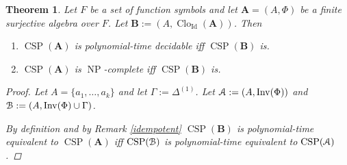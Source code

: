 \documentclass{amsart}
\theoremstyle{plain}
\newtheorem{theorem}{Theorem}[section]
\theoremstyle{definition}
\theoremstyle{remark}
\DeclareMathOperator{\Clo}{Clo}
\DeclareMathOperator{\CSP}{CSP}
\DeclareMathOperator{\Inv}{Inv}
\DeclareMathOperator{\NP}{NP}
\DeclareMathOperator{\Id}{Id}
\begin{document}
\begin{theorem}
    Let $F$ be a set of function symbols and 
    let $\mathbf{A}=(A, \Phi)$  be a finite surjective algebra over $F$.
    Let $\mathbf{B}:=(A, \Clo_{\Id}(\mathbf{A}))$. 
    Then   
    \begin{enumerate}
        \item $\CSP(\mathbf{A})$ is polynomial-time decidable iff $\CSP(\mathbf{B})$ is. 
        \item $\CSP(\mathbf{A})$ is $\NP$-complete iff $\CSP(\mathbf{B})$ is. 
    \end{enumerate}
\begin{proof}
    Let $A=\{a_1, \ldots, a_k\}$ and let $\Gamma:=\Delta^{(1)}$. 
    Let $\EuScript{A}:=(A, \Inv(\Phi))$ and $\EuScript{B}:=(A, \Inv(\Phi) \cup \Gamma )$. 

    By definition and by Remark \ref{idempotent} $\CSP(\mathbf{B})$ is polynomial-time equivalent to $\CSP(\mathbf{A})$ iff 
    $\CSP(\EuScript{B})$ is polynomial-time equivalent to $\CSP(\EuScript{A})$.


\end{proof}
\end{theorem}
\end{document}

